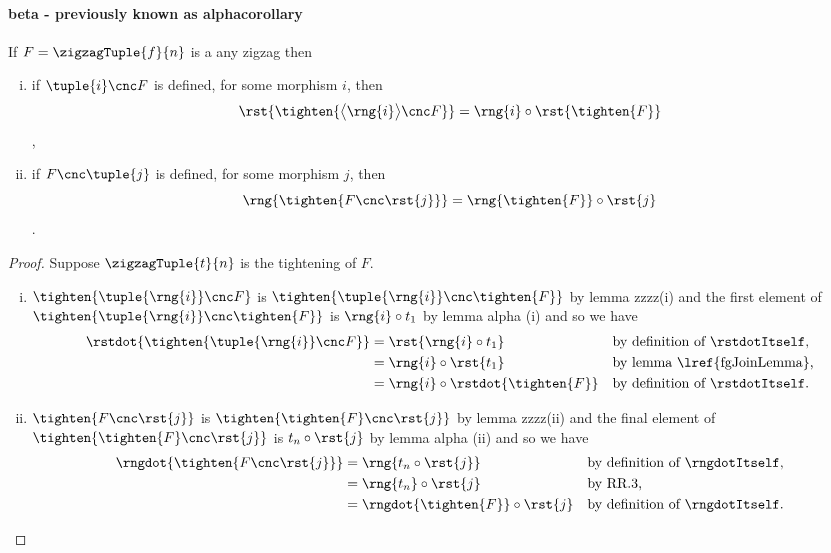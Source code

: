 \paragraph*{beta - previously known as alphacorollary}
\begin{lemma}
If $F=\zigzagTuple{f}{n}$ is a any zigzag then
\begin{enumerate}[(i)]
\item if $\tuple{i} \cnc F$ is defined, 
for some morphism $i$,  
then 
$$\rst{\tighten{\bigl\langle \rng{i} \bigr\rangle \cnc F}}
                = \rng{i} \circ \rst{\tighten{F}}$$, 
\item if $F \cnc \tuple{j}$ is defined, 
for some morphism $j$, then 
$$\rng{\tighten{F \cnc \rst{j}}} 
                = \rng{\tighten{F}} \circ \rst{j}$$. 
\end{enumerate}
\end{lemma}
\begin{proof}
Suppose $\zigzagTuple{t}{n}$ is the tightening of $F$.
\begin{enumerate}[(i)]
\item %
$\tighten{\tuple{\rng{i}} \cnc F}$ is
$\tighten{\tuple{\rng{i}} \cnc \tighten{F}}$
by lemma zzzz(i)
and the first element of
$\tighten{\tuple{\rng{i}} \cnc \tighten{F}}$
is $\rng{i} \circ t_1$
by lemma alpha (i)
and so we have
\begin{align*}
\rstdot{\tighten{\tuple{\rng{i}} \cnc F}}
&= \rst{\rng{i} \circ t_1}
          && \mbox{by definition of \rstdotItself,} \\
&= \rng{i} \circ \rst{t_1}
          && \mbox{by lemma \lref{fgJoinLemma},} \\
&= \rng{i} \circ \rstdot{\tighten{F}}
          && \mbox{by definition of \rstdotItself.}
\end{align*}
\item %
$\tighten{F \cnc \rst{j}}$ is $\tighten{\tighten{F} \cnc \rst{j}}$
by lemma zzzz(ii) 
and the final element of $\tighten{\tighten{F} \cnc \rst{j}}$
is $t_n \circ \rst{j}$ by lemma alpha (ii)
and so we have
\begin{align*}
\rngdot{\tighten{F \cnc \rst{j}}}
&= \rng{t_n \circ \rst{j}} 
          && \mbox{by definition of \rngdotItself,} \\
&= \rng{t_n} \circ \rst{j}  
          &&\mbox{by RR.3,} \\
&= \rngdot{\tighten{F}} \circ \rst{j}
          && \mbox{by definition of \rngdotItself.} 
\end{align*}
\end{enumerate}
\end{proof}


